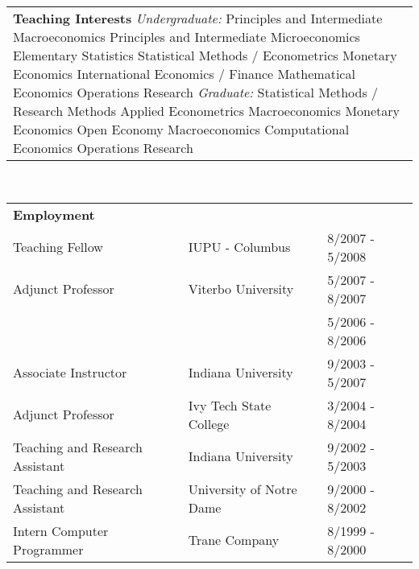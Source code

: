 \newpage

\begin{tabular}{p{6in}}
\textbf{Teaching Interests} \newline
\textit{Undergraduate:}\newline
Principles and Intermediate Macroeconomics \newline
Principles and Intermediate Microeconomics \newline
Elementary Statistics\newline
Statistical Methods / Econometrics \newline
Monetary Economics \newline
International Economics / Finance \newline 
Mathematical Economics \newline 
Operations Research \newline \newline
\textit{Graduate:}\newline
Statistical Methods / Research Methods \newline
Applied Econometrics \newline
Macroeconomics \newline
Monetary Economics \newline
Open Economy Macroeconomics \newline
Computational Economics \newline
Operations Research \newline
\end{tabular} \\

\begin{tabular}{p{2.5in} p{1.7in} p{1.5in}}
\textbf{Employment} \\
Teaching Fellow & IUPU - Columbus & 8/2007 - 5/2008 \\
Adjunct Professor & Viterbo University & 5/2007 - 8/2007 \\
 & & 5/2006 - 8/2006 \\
Associate Instructor & Indiana University & 9/2003 - 5/2007 \\
Adjunct Professor & Ivy Tech State College & 3/2004 - 8/2004 \\
Teaching and Research Assistant & Indiana University & 9/2002 - 5/2003 \\
Teaching and Research Assistant & University of Notre Dame & 9/2000 - 8/2002 \\
Intern Computer Programmer & Trane Company & 8/1999 - 8/2000 \\
\end{tabular} \\ \\

